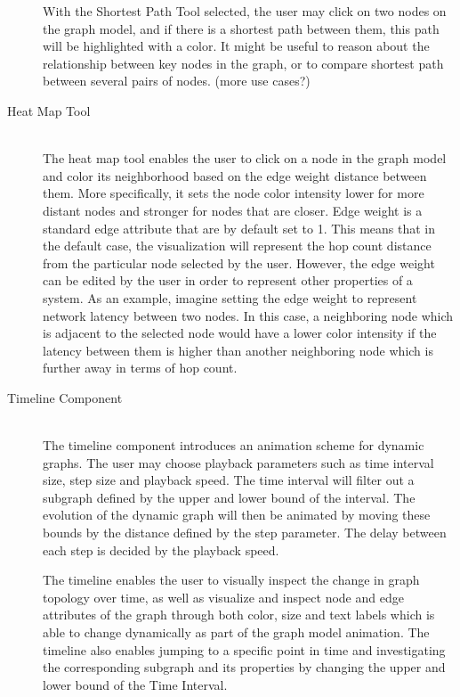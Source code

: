 \begin{description}
    With the Shortest Path Tool selected, the user may click on two nodes on
    the graph model, and if there is a shortest path between them, this path
    will be highlighted with a color. It might be useful to reason about the
    relationship between key nodes in the graph, or to compare shortest path
    between several pairs of nodes. (more use cases?)

\item[Heat Map Tool] \hfill \\

    The heat map tool enables the user to click on a node in the graph model
    and color its neighborhood based on the edge weight distance between
    them. More specifically, it sets the node color intensity lower for more
    distant nodes and stronger for nodes that are closer. Edge weight is a
    standard edge attribute that are by default set to 1. This means that in
    the default case, the visualization will represent the hop count
    distance from the particular node selected by the user. However, the
    edge weight can be edited by the user in order to represent other
    properties of a system. As an example, imagine setting the edge weight
    to represent network latency between two nodes. In this case, a
    neighboring node which is adjacent to the selected node would have a
    lower color intensity if the latency between them is higher than another
    neighboring node which is further away in terms of hop count.

\item[Timeline Component] \hfill \\

    The timeline component introduces an animation scheme for dynamic
    graphs. The user may choose playback parameters such as time
    interval size, step size and playback speed. The time interval will
    filter out a subgraph defined by the upper and lower bound of the
    interval. The evolution of the dynamic graph will then be animated
    by moving these bounds by the distance defined by the step
    parameter. The delay between each step is decided by the playback
    speed.

    The timeline enables the user to visually inspect the change in
    graph topology over time, as well as visualize and inspect node and
    edge attributes of the graph through both color, size and text
    labels which is able to change dynamically as part of the graph
    model animation. The timeline also enables jumping to a specific
    point in time and investigating the corresponding subgraph and its
    properties by changing the upper and lower bound of the Time
    Interval.


\end{description}
